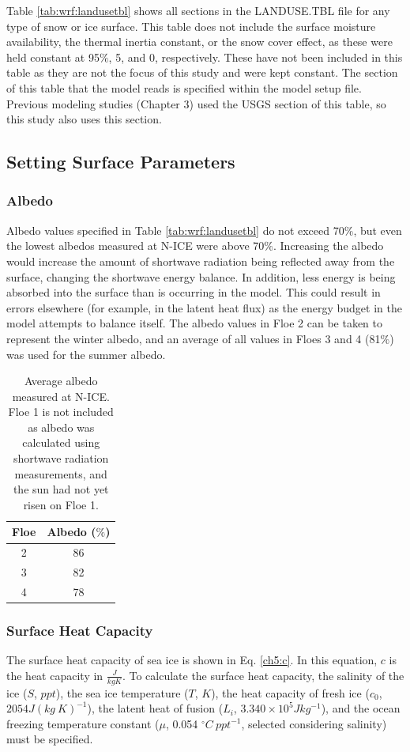 Table \ref{tab:wrf:landusetbl} shows all sections in the LANDUSE.TBL file for any type of snow or ice surface. This table does not include the surface moisture availability, the thermal inertia constant, or the snow cover effect, as these were held constant at 95$\%$, 5, and 0, respectively. These have not been included in this table as they are not the focus of this study and were kept constant. The section of this table that the model reads is specified within the model setup file. Previous modeling studies (Chapter 3) used the USGS section of this table, so this study also uses this section.

\subsection{Setting Surface Parameters}
\subsubsection{Albedo}
Albedo values specified in Table \ref{tab:wrf:landusetbl} do not exceed 70$\%$, but even the lowest albedos measured at N-ICE were above 70$\%$. Increasing the albedo would increase the amount of shortwave radiation being reflected away from the surface, changing the shortwave energy balance. In addition, less energy is being absorbed into the surface than is occurring in the model. This could result in errors elsewhere (for example, in the latent heat flux) as the energy budget in the model attempts to balance itself. The albedo values in Floe 2 can be taken to represent the winter albedo, and an average of all values in Floes 3 and 4 (81$\%$) was used for the summer albedo.

\begin{table}[t]
\centering
\footnotesize
\doublespacing 
{
\begin{tabular}{| c | c |}
 \hline
\rowcolor[HTML]{F3F3F3} \textbf{Floe} & \textbf{Albedo ($\%$)} \\
\hline
2 & 86 \\
3 & 82 \\
4 & 78 \\
 \hline
\end{tabular}}
\caption[N-ICE average measured albedo.]{Average albedo measured at N-ICE. Floe 1 is not included as albedo was calculated using shortwave radiation measurements, and the sun had not yet risen on Floe 1.}
\label{tab:albedos}
\end{table}

\subsubsection{Surface Heat Capacity}
The surface heat capacity of sea ice is shown in Eq. \ref{ch5:c}. In this equation, $c$ is the heat capacity in $\frac{J}{kg K}$. To calculate the surface heat capacity, the salinity of the ice ($S$, $ppt$), the sea ice temperature ($T$, $K$), the heat capacity of fresh ice ($c_{0}$, $2054 J(kg~K)^{-1}$), the latent heat of fusion ($L_{i}$, $3.340 \times 10^{5} Jkg^{-1}$), and the ocean freezing temperature constant ($\mu$, 0.054 $^{\circ}C~ppt^{-1}$, selected considering salinity) must be specified. 

